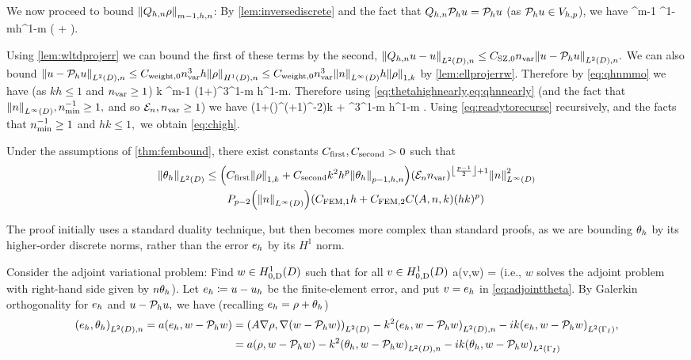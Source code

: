 We now proceed to bound $\Nfn{m-1,h,n}{\Qhn \rho}$: By \cref{lem:inversediscrete} and the fact that $Q_{h,n} \mathcal P_{h} u = \mathcal P_{h} u$ (as $\mathcal P_{h} u \in V_{h,p}$), we have
\beq\label{eq:qhnmmo}
 \leq \Chinv^{m-1} \nmin^{1-m}h^{1-m} \mleft( + \mright).
\eeq

Using \cref{lem:wltdprojerr} we can bound the first of these terms by the second, $\NLtDn{\Qhn u - u} \leq \CSZfn{0} \nvar \NLtDn{u-\Ph u}.$ We can also bound $\NLtDn{u - \Ph u} \leq \Cwfn{0} \nvar^3h \NHnfn{1}{D}{\rho} \leq \Cwfn{0} \nvar^3\NLiD{n} h \NW{\rho}$ by \cref{lem:ellprojerrw}. Therefore by \cref{eq:qhnmmo} we have (as $kh \leq 1$ and $n_{\mathrm{var}} \geq 1$)
\beq\label{eq:qhnnearly}
k  \leq \Chinv^{m-1} \mleft(1+\mright)\nvar^3\nmin^{1-m} h^{1-m}\NW{\rho}.
\eeq
Therefore using \cref{eq:thetahighnearly,eq:qhnnearly} (and the fact that $\NLiD{n}, \nmin^{-1} \geq 1,$ and so $\mathcal E_{n}, n_{\mathrm{var}} \geq1$)  we have
\beq\label{eq:readytorecurse}
 \leq {} \mleft(1+\mleft(\En\nvar\mright)^{\half(+1)}\nmin^{-2}\mright)k  + \CRect \nvar^3\nmin^{1-m} h^{1-m} \NW{\rho}.
\eeq
Using \cref{eq:readytorecurse} recursively, and the facts that $n_{\min}^{-1} \geq 1$ and $hk \leq 1,$ we obtain \cref{eq:chigh}.
\epf

\label{lem:ltthetahbound}
Under the assumptions of \cref{thm:fembound}, there exist constants $C_{\mathrm{first}}, C_{\mathrm{second}} > 0$ such that
\begin{align}
\NLtD{\thetah}&\leq \mleft(\Cfirst\NW{\rho} +\Csecond  k^2h^p\Nfn{p-1,h,n}{\thetah}\mright)\mleft(\En \nvar\mright)^{\floor{\frac{p-1}2}+1}\NLiD{n}^2\nonumber\\
&\quad\quad\Pfn{p-2}\mleft(\NLiD{n}\mright)\mleft(\CFEMotilde h + \CFEMttilde \CAnk (hk)^p\mright)\label{eq:ltthetahbound}
\end{align}
\ele

The proof initially uses a standard duality technique, but then becomes more complex than standard proofs, as we are bounding $\theta_{h}$ by its higher-order discrete norms, rather than the error $e_{h}$ by its $H^1$ norm.

Consider the adjoint variational problem: Find $w \in \HozDD$ such that for all $v \in \HozDD$
\beq\label{eq:adjointtheta}
a(v,w) = 
\eeq
(i.e., $w$ solves the adjoint problem with right-hand side given by $n\theta_{h}$). Let $e_{h} \coloneqq u -u_{h}$ be the finite-element error, and put $v = e_{h}$ in \cref{eq:adjointtheta}. By Galerkin orthogonality for $e_{h}$ and $u-\mathcal P_{h} u,$ we have (recalling $e_{h} = \rho + \theta_{h}$)
\begin{align}
\IPLtDn{\eh}{\thetah} = a(\eh,w-\Ph w) &= \IPLtD{A \grad \rho}{\grad(w-\Ph w)}  -k^2 \IPLtDn{\eh}{w-\Ph w} -ik \IPLtGI{\eh}{w-\Ph w},\nonumber\\
&=a(\rho,w-\Ph w) -k^2 \IPLtDn{\thetah}{w-\Ph w} -ik \IPLtGI{\thetah}{w-\Ph w}\label{eq:doublego}
\end{align}

